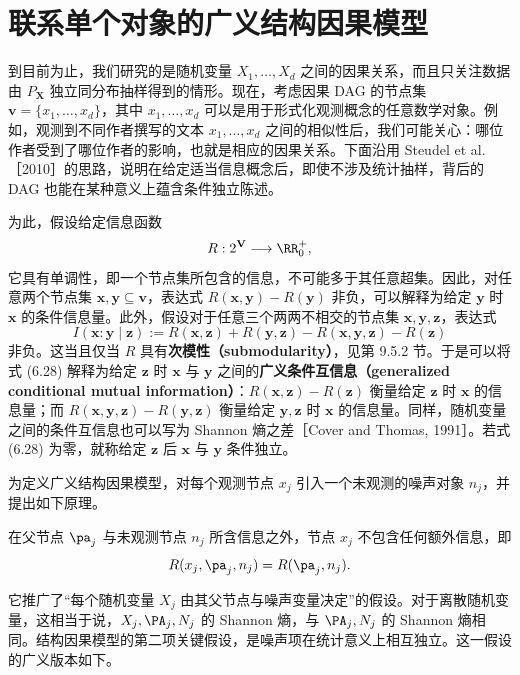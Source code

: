 \section{联系单个对象的广义结构因果模型}
\label{sec:ch06-generalized}

到目前为止，我们研究的是随机变量 $X_1,\ldots,X_d$ 之间的因果关系，而且只关注数据由 $P_{\mathbf X}$ 独立同分布抽样得到的情形。现在，考虑因果 DAG 的节点集 $\mathbf v=\{x_1,\ldots,x_d\}$，其中 $x_1,\ldots,x_d$ 可以是用于形式化观测概念的任意数学对象。例如，观测到不同作者撰写的文本 $x_1,\ldots,x_d$ 之间的相似性后，我们可能关心：哪位作者受到了哪位作者的影响，也就是相应的因果关系。下面沿用 Steudel et al.［2010］的思路，说明在给定适当信息概念后，即使不涉及统计抽样，背后的 DAG 也能在某种意义上蕴含条件独立陈述。

为此，假设给定信息函数
\[
 R:2^{\mathbf V}\longrightarrow\RR_0^+,
\]
它具有单调性，即一个节点集所包含的信息，不可能多于其任意超集。因此，对任意两个节点集 $\mathbf x,\mathbf y\subseteq\mathbf v$，表达式 $R(\mathbf x,\mathbf y)-R(\mathbf y)$ 非负，可以解释为给定 $\mathbf y$ 时 $\mathbf x$ 的条件信息量。此外，假设对于任意三个两两不相交的节点集 $\mathbf x,\mathbf y,\mathbf z$，表达式
\begin{equation}
 I(\mathbf x:\mathbf y\mid\mathbf z)
 :=R(\mathbf x,\mathbf z)+R(\mathbf y,\mathbf z)
 -R(\mathbf x,\mathbf y,\mathbf z)-R(\mathbf z)
 \tag{6.28}
\end{equation}
非负。这当且仅当 $R$ 具有\textbf{次模性（submodularity）}，见第 9.5.2 节。于是可以将式 (6.28) 解释为给定 $\mathbf z$ 时 $\mathbf x$ 与 $\mathbf y$ 之间的\textbf{广义条件互信息（generalized conditional mutual information）}：$R(\mathbf x,\mathbf z)-R(\mathbf z)$ 衡量给定 $\mathbf z$ 时 $\mathbf x$ 的信息量；而 $R(\mathbf x,\mathbf y,\mathbf z)-R(\mathbf y,\mathbf z)$ 衡量给定 $\mathbf y,\mathbf z$ 时 $\mathbf x$ 的信息量。同样，随机变量之间的条件互信息也可以写为 Shannon 熵之差［Cover and Thomas, 1991］。若式 (6.28) 为零，就称给定 $\mathbf z$ 后 $\mathbf x$ 与 $\mathbf y$ 条件独立。

为定义广义结构因果模型，对每个观测节点 $x_j$ 引入一个未观测的噪声对象 $n_j$，并提出如下原理。

\begin{principle}[无额外信息]
在父节点 $\pa_j$ 与未观测节点 $n_j$ 所含信息之外，节点 $x_j$ 不包含任何额外信息，即
\[
 R(x_j,\pa_j,n_j)=R(\pa_j,n_j).
\]
\end{principle}

它推广了“每个随机变量 $X_j$ 由其父节点与噪声变量决定”的假设。对于离散随机变量，这相当于说，$X_j,\PA_j,N_j$ 的 Shannon 熵，与 $\PA_j,N_j$ 的 Shannon 熵相同。结构因果模型的第二项关键假设，是噪声项在统计意义上相互独立。这一假设的广义版本如下。

